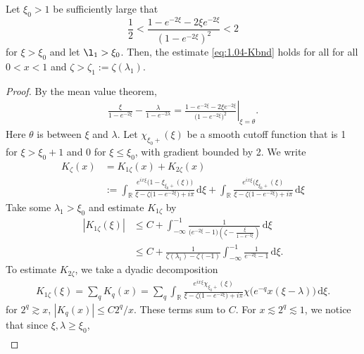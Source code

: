 \documentclass[../dissertation.tex]{subfiles}
\begin{document}
\begin{lma}%
	\label{lma:1.04-largez}
	Let $\xi_0 > 1$ be sufficiently large that
	\[
		\frac{1}{2} 
			< \frac{1-e^{-2\xi}-2 \xi e^{-2\xi}}{\left(1-e^{-2\xi}\right)^2} 
			< 2
	\]
	for $\xi > \xi_0$ and let $\l_1 > \xi_0$. Then, the estimate
	\eqref{eq:1.04-Kbnd} holds for all for all $0 < x < 1$ and 
	$\zeta > \zeta_1 := \zeta(\lambda_1)$.
\end{lma}
\begin{proof}
	By the mean value theorem,
	\begin{align}\label{eq:1.04-14}
		\frac{\xi}{1-e^{-2\xi}} - \frac{\lambda}{1-e^{-2\lambda}}
			= \left. 
					\frac{1- e^{-2\xi} - 2 \xi e^{-2\xi}}{\big(1-e^{-2\xi}\big)^2}
				\right|_{\xi = \theta}.
	\end{align}
	Here $\theta$ is between $\xi$ and $\lambda$. Let $\chi_{\xi_0+}(\xi)$ be a smooth
	cutoff function that is 1 for $\xi > \xi_0 +1$ and 0 for $\xi \leq \xi_0$, with 
	gradient bounded by 2. We write
	\begin{align*}
		K_{\zeta}(x)
			&= K_{1\zeta}(x) + K_{2\zeta}(x) \\
			&:= \int_{\mathbb R}
					\frac{e^{ix\xi}\big(1 - \xi_{\xi_0+}(\xi) \big)}
						{\xi - \zeta\big( 1 - e^{-2\xi} \big) + i\pi}
				\, \mathrm{d}\xi
				+
				\int_{\mathbb R}
					\frac{e^{ix\xi}\big(\xi_{\xi_0+}(\xi)}
						{\xi - \zeta\big( 1 - e^{-2\xi} \big) + i\pi}
				\, \mathrm{d}\xi
	\end{align*}
	Take some $\lambda_1 > \xi_0$ and estimate $K_{1\zeta}$ by 
	\begin{align*}
		|K_{1\zeta}(\xi)|
			&\leq C + 
				\int_{-\infty}^{-1} 
					\frac{1}{\big(e^{-2\xi}-1\big)\left(\zeta-\frac{\xi}{1-e^{-2\xi}}\right)}
				\, \mathrm{d}\xi \\
			&\leq C + 
				\frac{1}{\zeta(\lambda_1) - \zeta(-1)}
				\int_{-\infty}^{-1} 
					\frac{1}{e^{-2\xi}-1}
				\, \mathrm{d}\xi.
	\end{align*}
	To estimate $K_{2\zeta}$, we take a dyadic decomposition
	\begin{align*}
		K_{1\zeta}(\xi)
			= \sum_q K_q(x) 
			= \sum_q 
				\int_{\mathbb R}
					\frac{e^{ix\xi}\chi_{\xi_0+}(\xi)}
						{\xi -\zeta\big(1-e^{-2\xi}\big)+i\pi}
					\chi\big(e^{-q} x (\xi - \lambda)\big)
				\, \mathrm{d}\xi.
	\end{align*}
	for $2^q \gtrsim x$, $|K_q(x)| \leq C2^q/x$. These terms sum to $C$. For 
	$x \lesssim 2^q \lesssim 1$, we notice that since $\xi, \lambda \geq \xi_0$,
	\begin{align*}

\end{align*}
\end{proof}
\end{document}
